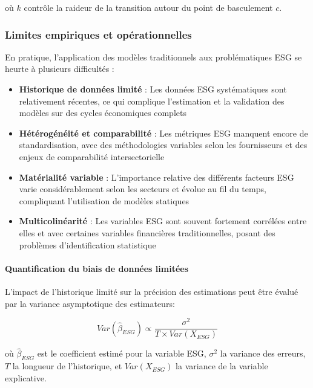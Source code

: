 où $k$ contrôle la raideur de la transition autour du point de basculement $c$.

\subsubsection{Limites empiriques et opérationnelles}

En pratique, l'application des modèles traditionnels aux problématiques ESG se heurte à plusieurs difficultés :

\begin{itemize}
    \item \textbf{Historique de données limité} : Les données ESG systématiques sont relativement récentes, ce qui complique l'estimation et la validation des modèles sur des cycles économiques complets
    
    \item \textbf{Hétérogénéité et comparabilité} : Les métriques ESG manquent encore de standardisation, avec des méthodologies variables selon les fournisseurs et des enjeux de comparabilité intersectorielle
    
    \item \textbf{Matérialité variable} : L'importance relative des différents facteurs ESG varie considérablement selon les secteurs et évolue au fil du temps, compliquant l'utilisation de modèles statiques
    
    \item \textbf{Multicolinéarité} : Les variables ESG sont souvent fortement corrélées entre elles et avec certaines variables financières traditionnelles, posant des problèmes d'identification statistique
\end{itemize}

\paragraph{Quantification du biais de données limitées}
L'impact de l'historique limité sur la précision des estimations peut être évalué par la variance asymptotique des estimateurs:

\begin{equation}
Var(\hat{\beta}_{ESG}) \propto \frac{\sigma^2}{T \times Var(X_{ESG})}
\end{equation}

où $\hat{\beta}_{ESG}$ est le coefficient estimé pour la variable ESG, $\sigma^2$ la variance des erreurs, $T$ la longueur de l'historique, et $Var(X_{ESG})$ la variance de la variable explicative.

